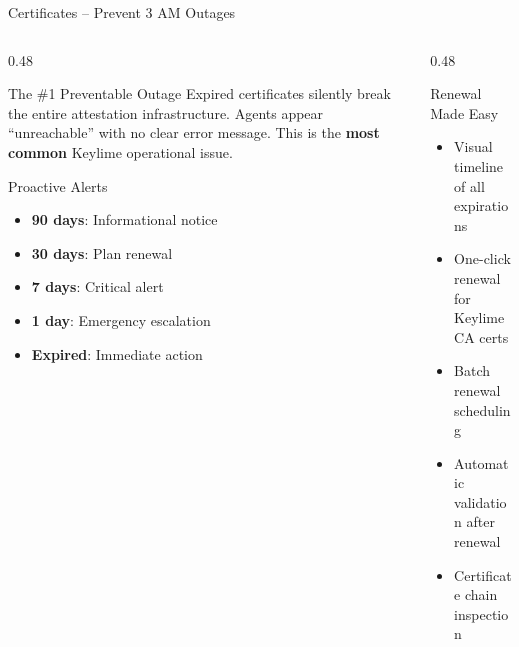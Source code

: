 \begin{frame}{Certificates -- Prevent 3 AM Outages}
  \begin{columns}[T]
    \begin{column}{0.48\textwidth}
      \begin{alertblock}{The \#1 Preventable Outage}
        \scriptsize
        Expired certificates silently break the entire attestation infrastructure.
        Agents appear ``unreachable'' with no clear error message. This is
        the \textbf{most common} Keylime operational issue.
      \end{alertblock}

      \vspace{0.2cm}

      \begin{block}{Proactive Alerts}
        \scriptsize
        \begin{itemize}
          \item \textbf{90 days}: Informational notice
          \item \textbf{30 days}: Plan renewal
          \item \textbf{7 days}: Critical alert
          \item \textbf{1 day}: Emergency escalation
          \item \textbf{Expired}: Immediate action
        \end{itemize}
      \end{block}
    \end{column}
    \begin{column}{0.48\textwidth}
      \begin{exampleblock}{Renewal Made Easy}
        \scriptsize
        \begin{itemize}
          \item Visual timeline of all expirations
          \item One-click renewal for Keylime CA certs
          \item Batch renewal scheduling
          \item Automatic validation after renewal
          \item Certificate chain inspection
        \end{itemize}
      \end{exampleblock}

      \vspace{0.2cm}

      \begin{center}
      \end{center}
    \end{column}
  \end{columns}
\end{frame}
